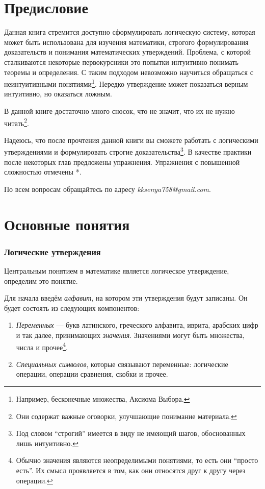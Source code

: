 \part{Предисловие}

Данная книга стремится доступно сформулировать логическую систему,
которая может быть использована для изучения математики, строгого
формулирования доказательств и понимания математических утверждений.
Проблема, с которой сталкиваются некоторые первокурсники это попытки
интуитивно понимать теоремы и определения. С таким подходом невозможно
научиться обращаться с неинтуитивными
понятиями\footnote{Например, бесконечные множества, Аксиома Выбора.}.
Нередко утверждение может показаться верным интуитивно,
но оказаться ложным.

В данной книге достаточно много сносок, что не значит, что их
не нужно читать\footnote{Они содержат важные оговорки,
	улучшающие понимание материала.}.

Надеюсь, что после прочтения данной книги вы сможете работать с логическими
утверждениями и формулировать строгие доказательства\footnote{Под словом ``строгий''
	имеется в виду не имеющий шагов, обоснованных лишь интуитивно.}. В качестве практики
после некоторых глав предложены упражнения. Упражнения с повышенной сложностью
отмечены *.

По всем вопросам обращайтесь по адресу {\sl kksenya758@gmail.com}.

\part{Основные понятия}

\section{Логические утверждения}

Центральным понятием в математике является логическое утверждение,
определим это понятие.

Для начала введём {\it алфавит}, на котором эти утверждения будут записаны.
Он будет состоять из следующих компонентов:
\begin{enumerate}
	\item{}{\it Переменных} --- букв латинского, греческого алфавита,
	иврита, арабских цифр и так далее, принимающих {\it значения}.
	Значениями могут быть множества, числа и прочее\footnote{Обычно значения
		являются неопределимыми понятиями, то есть они ``просто есть''. Их смысл
		проявляется в том, как они относятся друг к другу через операции.}.
	\item{}{\it Специальных символов}, которые связывают переменные:
	логические операции, операции сравнения, скобки и прочее.
\end{enumerate}


